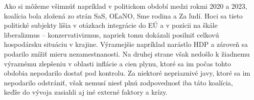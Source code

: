 \documentclass[main.tex]{subfiles}
\begin{document}
\clearpage
Ako si môžeme všimnúť napríklad v politickom období medzi rokmi 2020 a 2023, koalícia bola zložená zo strán SaS, OĽaNO, Sme rodina a Za ľudí. Hoci sa tieto politické subjekty líšia v otázkach integrácie do EÚ a v pozícii na škále liberalizmus – konzervativizmus, napriek tomu dokázali posilniť celkovú hospodársku situáciu v krajine. Výraznejšie napríklad narástlo HDP a zároveň sa podarilo znížiť mieru nezamestnanosti. Na druhej strane však nedošlo k žiadnemu výraznému zlepšeniu v oblasti inflácie a cien plynu, ktoré sa im počas tohto obdobia nepodarilo dostať pod kontrolu. Za niektoré nepriaznivé javy, ktoré sa im nepodarilo odstrániť, však nemusí niesť plnú zodpovednosť iba táto koalícia, keďže do vývoja zasiahli aj iné externé faktory a krízy.
\end{document}

